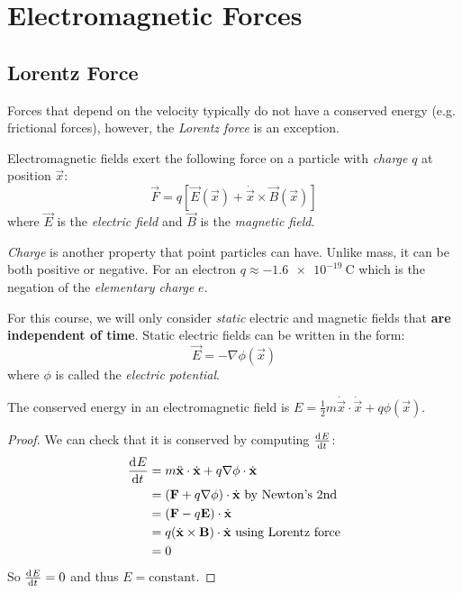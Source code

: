 \documentclass[../main.tex]{subfiles}
\begin{document}
\section{Electromagnetic Forces}
\subsection{Lorentz Force}
\label{lorentzForce}
Forces that depend on the velocity typically do not have a conserved energy (e.g. frictional forces), however, the \textit{Lorentz force} is an exception.
\begin{definition}
  Electromagnetic fields exert the following force on a particle with \textit{charge} $q$ at position $\vec{x}$:
  \[
    \vec{F} = q[\vec{E}(\vec{x}) + \dot{\vec{x}} \times \vec{B}(\vec{x})]
  \]
  where $\vec{E}$ is the \textit{electric field} and $\vec{B}$ is the \textit{magnetic field}.
\end{definition}
\begin{remark}[Charge]
  \textit{Charge} is another property that point particles can have.
  Unlike mass, it can be both positive or negative.
  For an electron $q \approx \qty{-1.6e-19}{\coulomb}$ which is the negation of the \textit{elementary charge} $e$.
\end{remark}
For this course, we will only consider \textit{static} electric and magnetic fields that \textbf{are independent of time}.
Static electric fields can be written in the form:
\[
  \vec{E} = -\nabla \phi(\vec{x})
\]
where $\phi$ is called the \textit{electric potential}.
\begin{proposition}
  The conserved energy in an electromagnetic field is $E = \frac{1}{2} m \dot{\vec{x}} \cdot \dot{\vec{x}} + q\phi(\vec{x})$.
\end{proposition}
\begin{proof}
  We can check that it is conserved by computing $\deriv{E}{t}$:
  \begin{align*}
    \deriv{E}{t} &= m \ddot{\vec{x}} \cdot \dot{\vec{x}} + q \nabla \phi \cdot \dot{\vec{x}} \\
                 &= (\vec{F} + q\nabla\phi) \cdot \dot{\vec{x}} \text{ by Newton's 2nd} \\
                 &= (\vec{F} - q\vec{E}) \cdot \dot{\vec{x}} \\
                 &= q(\dot{\vec{x}} \times \vec{B}) \cdot \dot{\vec{x}} \text{ using Lorentz force}\\
                 &= 0
  \end{align*}
  So $\deriv{E}{t} = 0$ and thus $E = \text{constant}$.
\end{proof}
\end{document}
